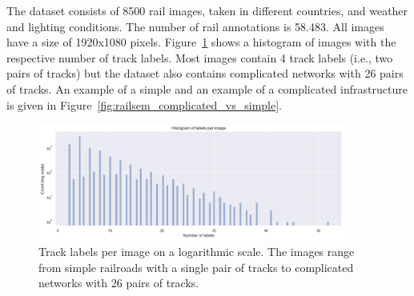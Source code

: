 \documentclass[Master,MDS,english]{BASE/twbook} %
\begin{document}
The dataset consists of 8500 rail images, taken in different countries, and weather and lighting conditions. The number of rail annotations is 58.483. All images have a size of 1920x1080 pixels. 
Figure~\ref{fig:labels_per_image_railsem} shows a histogram of images with the respective number of track labels. Most images contain 4 track labels (i.e., two pairs of tracks) but the dataset also contains complicated networks with 26 pairs of tracks. An example of a simple and an example of a complicated infrastructure is given in Figure~\ref{fig:railsem_complicated_vs_simple}.



\begin{figure}[h]
\centering
\includegraphics[width=0.9\textwidth]{images/datasets/railsem/labels_per_image}
\caption{Track labels per image on a logarithmic scale. The images range from simple railroads with a single pair of tracks to complicated networks with 26 pairs of tracks. }
\label{fig:labels_per_image_railsem}
\end{figure}
\end{document}
